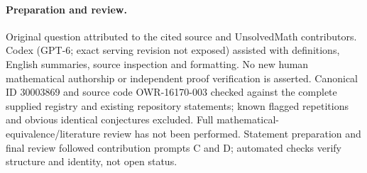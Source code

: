 \documentclass[11pt]{article}
\begin{document}
\paragraph{Preparation and review.}
Original question attributed to the cited source and UnsolvedMath contributors. Codex (GPT-6; exact serving revision not exposed) assisted with definitions, English summaries, source inspection and formatting. No new human mathematical authorship or independent proof verification is asserted. Canonical ID 30003869 and source code OWR-16170-003 checked against the complete supplied registry and existing repository statements; known flagged repetitions and obvious identical conjectures excluded. Full mathematical-equivalence/literature review has not been performed. Statement preparation and final review followed contribution prompts C and D; automated checks verify structure and identity, not open status.
\label{end:30003869}
\end{document}
